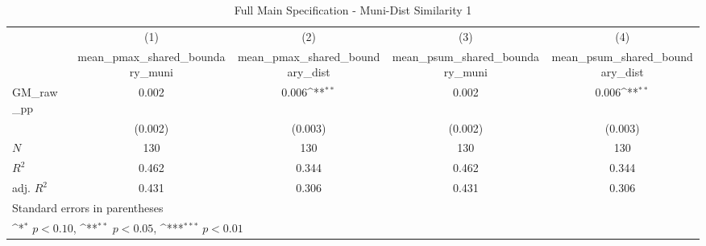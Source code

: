 \begin{table}[htbp]\centering
\def\sym#1{\ifmmode^{#1}\else\(^{#1}\)\fi}
\caption{Full Main Specification - Muni-Dist Similarity 1}
\begin{tabular}{l*{4}{c}}
\hline\hline
            &\multicolumn{1}{c}{(1)}&\multicolumn{1}{c}{(2)}&\multicolumn{1}{c}{(3)}&\multicolumn{1}{c}{(4)}\\
            &\multicolumn{1}{c}{mean\_pmax\_shared\_boundary\_muni}&\multicolumn{1}{c}{mean\_pmax\_shared\_boundary\_dist}&\multicolumn{1}{c}{mean\_psum\_shared\_boundary\_muni}&\multicolumn{1}{c}{mean\_psum\_shared\_boundary\_dist}\\
\hline
GM\_raw\_pp   &       0.002         &       0.006\sym{**} &       0.002         &       0.006\sym{**} \\
            &     (0.002)         &     (0.003)         &     (0.002)         &     (0.003)         \\
\hline
\(N\)       &         130         &         130         &         130         &         130         \\
\(R^{2}\)   &       0.462         &       0.344         &       0.462         &       0.344         \\
adj. \(R^{2}\)&       0.431         &       0.306         &       0.431         &       0.306         \\
\hline\hline
\multicolumn{5}{l}{\footnotesize Standard errors in parentheses}\\
\multicolumn{5}{l}{\footnotesize \sym{*} \(p<0.10\), \sym{**} \(p<0.05\), \sym{***} \(p<0.01\)}\\
\end{tabular}
\end{table}
